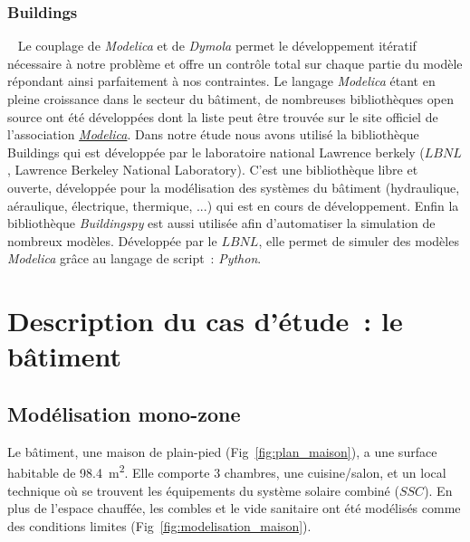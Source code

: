\subsubsection{Buildings} %
\label{ssub:buildings}
~
Le couplage de \emph{Modelica} et de \emph{Dymola} permet le développement itératif
nécessaire à notre problème et offre un contrôle total sur chaque partie du modèle
répondant ainsi parfaitement à nos contraintes. Le langage \emph{Modelica} étant en pleine
croissance dans le secteur du bâtiment, de nombreuses bibliothèques open source ont été
développées dont la liste peut être trouvée sur le site officiel de l’association
\href{https://www.modelica.org/libraries}{\emph{Modelica}}. Dans notre étude nous avons
utilisé la bibliothèque Buildings qui est développée par le laboratoire national Lawrence
berkely ($LBNL$, Lawrence Berkeley National Laboratory). C’est une bibliothèque libre et
ouverte, développée pour la modélisation des systèmes du bâtiment (hydraulique,
aéraulique, électrique, thermique, ...) qui est en cours de développement. Enfin la
bibliothèque \emph{Buildingspy} est aussi utilisée afin d’automatiser la simulation de
nombreux modèles. Développée par le $LBNL$, elle permet de simuler des modèles
\emph{Modelica} grâce au langage de script~: \emph{Python}.




\section{Description du cas d’étude~: le bâtiment} %
\label{sec:description_du_cas_d_etude_le_batiment}
\subsection{Modélisation mono-zone} %
\label{sub:modelisation_monozone}
Le bâtiment, une maison de plain-pied (Fig~\ref{fig:plan_maison}), a une surface habitable
de \SI{98.4}{\meter\squared}. Elle comporte 3 chambres, une cuisine/salon, et un local
technique où se trouvent les équipements du système solaire combiné ($SSC$). En plus de
l’espace chauffée, les combles et le vide sanitaire ont été modélisés comme des conditions
limites (Fig~\ref{fig:modelisation_maison}).

